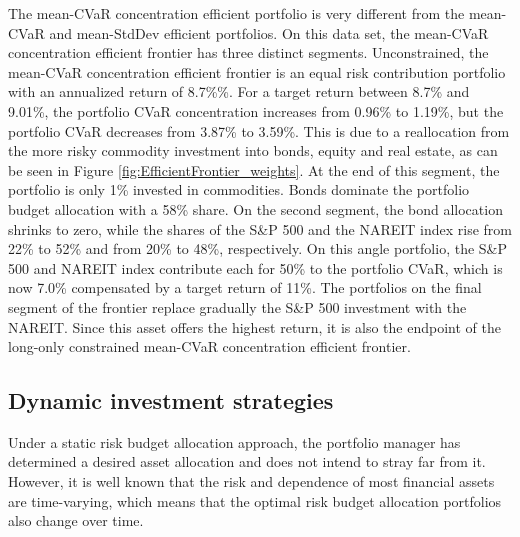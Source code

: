 \documentclass[12pt,a4paper]{article}
\begin{document}
The mean-CVaR concentration efficient portfolio is very different from the mean-CVaR and mean-StdDev efficient portfolios. On this data set, the mean-CVaR concentration efficient frontier has three distinct segments. Unconstrained, the mean-CVaR concentration efficient frontier is an equal risk contribution portfolio with an annualized return of 8.7\%\%. For a target return between 8.7\% and 9.01\%, the portfolio CVaR concentration increases from 0.96\% to 1.19\%, but the portfolio CVaR decreases from 3.87\% to 3.59\%. This is due to a reallocation from the more risky commodity investment into bonds, equity and real estate, as can be seen in Figure \ref{fig:EfficientFrontier_weights}. At the end of this segment, the portfolio is only 1\% invested in commodities. Bonds dominate the portfolio budget allocation with a 58\% share. On the second segment, the bond allocation shrinks to zero, while the shares of the S\&P 500 and the NAREIT index rise from 22\% to 52\% and from 20\% to 48\%, respectively. On this angle portfolio, the S\&P 500 and NAREIT index contribute each for 50\% to the portfolio CVaR, which is now 7.0\% compensated by a target return of 11\%. The portfolios on the final segment of the frontier replace gradually the S\&P 500 investment with the NAREIT. Since this asset offers the highest return, it is also the endpoint of the long-only constrained mean-CVaR concentration efficient frontier.

\clearpage
\subsection{Dynamic investment strategies}\label{subsec:dynamic}

Under a static risk budget allocation approach, the portfolio manager has determined a desired asset allocation and does not intend
to stray far from it. However, it is well known that the risk and dependence of most financial assets are time-varying, which means that the optimal risk budget allocation portfolios also change over time. 
\end{document}
